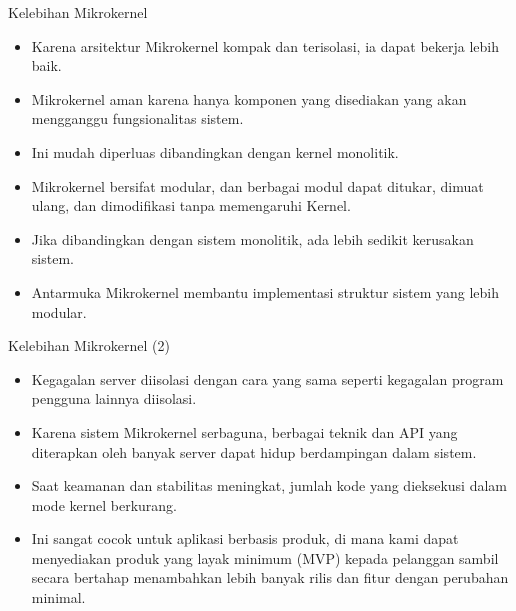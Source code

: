 \documentclass[aspectratio=169, table]{beamer}
\begin{document}
    \begin{frame}{Kelebihan Mikrokernel}
        \begin{itemize}

            \item Karena arsitektur Mikrokernel kompak dan terisolasi, ia dapat bekerja lebih baik.

            \item Mikrokernel aman karena hanya komponen yang disediakan yang akan mengganggu fungsionalitas sistem.

            \item Ini mudah diperluas dibandingkan dengan kernel monolitik.

            \item Mikrokernel bersifat modular, dan berbagai modul dapat ditukar, dimuat ulang, dan dimodifikasi tanpa memengaruhi Kernel.

            \item Jika dibandingkan dengan sistem monolitik, ada lebih sedikit kerusakan sistem.

            \item Antarmuka Mikrokernel membantu implementasi struktur sistem yang lebih modular.


        \end{itemize}
    \end{frame}
    \begin{frame}{Kelebihan Mikrokernel (2)}
        \begin{itemize}

            \item Kegagalan server diisolasi dengan cara yang sama seperti kegagalan program pengguna lainnya diisolasi.

            \item Karena sistem Mikrokernel serbaguna, berbagai teknik dan API yang diterapkan oleh banyak server dapat hidup berdampingan dalam sistem.

            \item Saat keamanan dan stabilitas meningkat, jumlah kode yang dieksekusi dalam mode kernel berkurang.

            \item Ini sangat cocok untuk aplikasi berbasis produk, di mana kami dapat menyediakan produk yang layak minimum (MVP) kepada pelanggan sambil secara bertahap menambahkan lebih banyak rilis dan fitur dengan perubahan minimal.

        \end{itemize}
    \end{frame}
\end{document}
